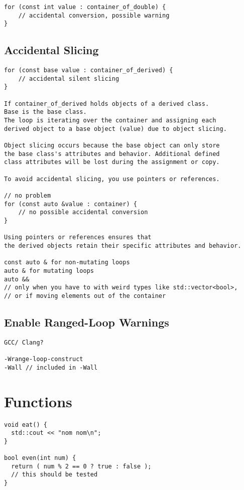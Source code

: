 \begin{verbatim}
for (const int value : container_of_double) {
    // accidental conversion, possible warning
}
\end{verbatim}

\subsection{Accidental Slicing}

\begin{verbatim}
for (const base value : container_of_derived) {
    // accidental silent slicing
}

If container_of_derived holds objects of a derived class. 
Base is the base class.
The loop is iterating over the container and assigning each
derived object to a base object (value) due to object slicing.

Object slicing occurs because the base object can only store
the base class's attributes and behavior. Additional defined 
class attributes will be lost during the assignment or copy.

To avoid accidental slicing, you use pointers or references.

// no problem
for (const auto &value : container) {
    // no possible accidental conversion
}

Using pointers or references ensures that 
the derived objects retain their specific attributes and behavior.

const auto & for non-mutating loops
auto & for mutating loops
auto && 
// only when you have to with weird types like std::vector<bool>,
// or if moving elements out of the container
\end{verbatim}

\subsection{Enable Ranged-Loop Warnings}

\begin{verbatim}
GCC/ Clang?

-Wrange-loop-construct
-Wall // included in -Wall
\end{verbatim}

\section{Functions}

\begin{verbatim}
void eat() {
  std::cout << "nom nom\n";
}

bool even(int num) {
  return ( num % 2 == 0 ? true : false );
  // this should be tested
}
\end{verbatim}

